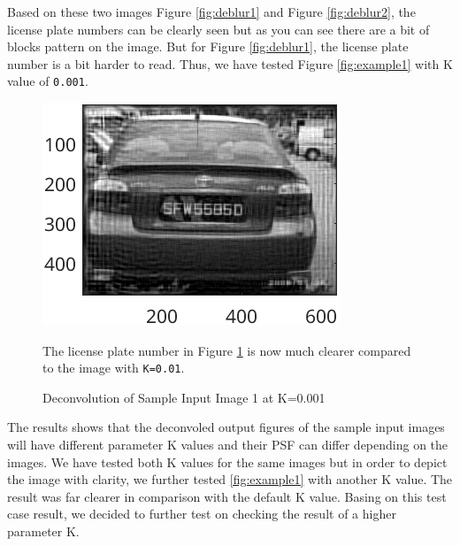 \documentclass{article}
\begin{document}
\begin{itemize}
			Based on these two images Figure {\ref{fig:deblur1}} and Figure {\ref{fig:deblur2}}, the license plate numbers can be clearly seen but as you can see there are a bit of blocks pattern
			on the image. But for Figure {\ref{fig:deblur1}}, the license plate number is a bit harder to read. Thus, we have tested Figure {\ref{fig:example1}} with K value of {\texttt{0.001}}.
			
			\begin{figure}[ht]
  			\begin{minipage}{0.4\textwidth}
    			\centering
    			\includegraphics[width=\textwidth]{2AE1K0.001}
    			\caption{Deconvolution of Sample Input Image 1 at K=0.001}
    			\label{fig:deblur1a}
  			\end{minipage}
  			\hfill
  			\begin{minipage}{0.35\textwidth}
    			The license plate number in Figure {\ref{fig:deblur1a}} is now much clearer compared to the image with {\texttt{K=0.01}}.
  			\end{minipage}
			\end{figure}

			The results shows that the deconvoled output figures of the sample input images will have different parameter K values and their PSF can differ depending on the images. We have tested
			both K values for the same images but in order to depict the image with clarity, we further tested {\ref{fig:example1}} with another K value. The result was far clearer in comparison
			with the default K value. Basing on this test case result, we decided to further test on checking the result of a higher parameter K.



\end{itemize}
\end{document}

